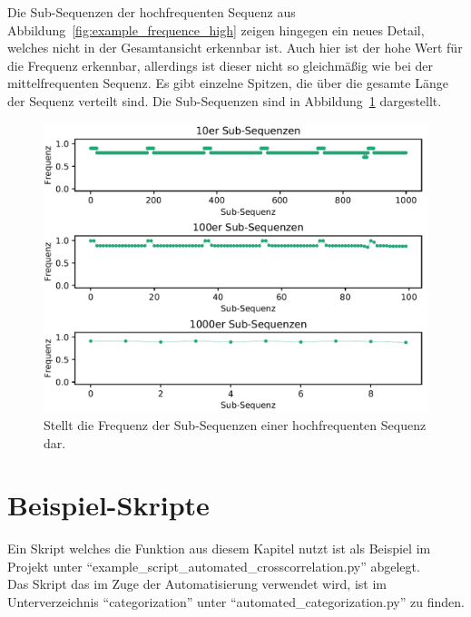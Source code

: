 Die Sub-Sequenzen der hochfrequenten Sequenz aus Abbildung~\ref{fig:example_frequence_high} zeigen hingegen ein neues Detail, welches nicht in der Gesamtansicht erkennbar ist.
Auch hier ist der hohe Wert für die Frequenz erkennbar, allerdings ist dieser nicht so gleichmäßig wie bei der mittelfrequenten Sequenz.
Es gibt einzelne Spitzen, die über die gesamte Länge der Sequenz verteilt sind. 
Die Sub-Sequenzen sind in Abbildung~\ref{fig:example_frequence_high_subsequences} dargestellt.
\begin{figure}[H]
	\includegraphics[width=\linewidth]{pythonImplementation/images/example_frequence_high_subsequences.PNG}
	\caption[Darstellung der Sub-Sequenzen im Bezug auf die Frequenz einer hochfrequenten Sequenz]{Stellt die Frequenz der Sub-Sequenzen einer hochfrequenten Sequenz dar\footnotemark.}
	\label{fig:example_frequence_high_subsequences}
\end{figure}

\section{Beispiel-Skripte}
Ein Skript welches die Funktion aus diesem Kapitel nutzt ist als Beispiel im Projekt unter \enquote{example\_script\_automated\_crosscorrelation.py} abgelegt.\\
Das Skript das im Zuge der Automatisierung verwendet wird, ist im Unterverzeichnis \enquote{categorization} unter \enquote{automated\_categorization.py} zu finden.
